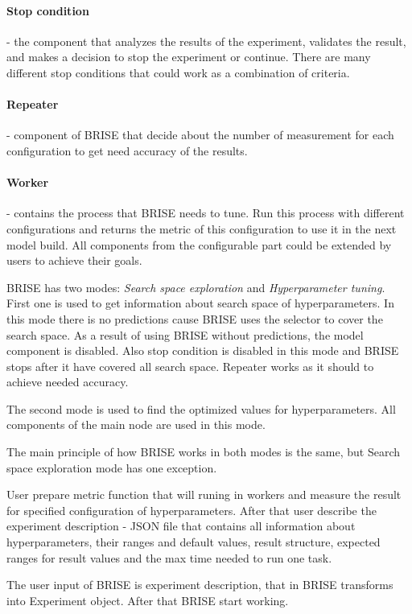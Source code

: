 	\paragraph{Stop condition} - the component that analyzes the results of the experiment, validates the result, and makes a decision to stop the experiment or continue. There are many different stop conditions that could work as a combination of criteria.
	\paragraph{Repeater} - component of BRISE that decide about the number of measurement for each configuration to get need accuracy of the results. 
	\paragraph{Worker} - contains the process that BRISE needs to tune. Run this process with different configurations and returns the metric of this configuration to use it in the next model build.
All components from the configurable part could be extended by users to achieve their goals.

BRISE has two modes: \textit{Search space exploration} and \textit{Hyperparameter tuning}.
First one is used to get information about search space of hyperparameters. In this mode there is no predictions cause BRISE uses the selector to cover the search space. As a result of using BRISE without predictions, the model component is disabled. Also stop condition is disabled in this mode and BRISE stops after it have covered all search space. Repeater works as it should to achieve needed accuracy.

The second mode is used to find the optimized values for hyperparameters. All components of the main node are used in this mode.

The main principle of how BRISE works in both modes is the same, but 
Search space exploration mode has one exception.

User prepare metric function that will runing in workers and measure the result for specified configuration of hyperparameters.
After that user describe the experiment description - JSON file that contains all information about hyperparameters, their ranges and default values, result structure, expected ranges for result values and the max time needed to run one task.

The user input of BRISE is experiment description, that in BRISE transforms into Experiment object. After that BRISE start working.

